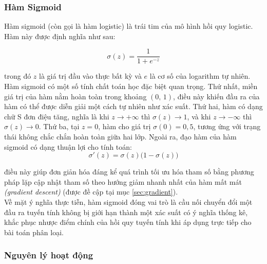 \subsubsection{Hàm Sigmoid}
 
Hàm sigmoid (còn gọi là hàm logistic) là trái tim của mô hình hồi quy logistic. Hàm này được định nghĩa như sau:
 
\begin{equation}
  \sigma(z) = \frac{1}{1 + e^{-z}}
  \label{eq:sigmoid}
\end{equation}
 
\noindent trong đó $z$ là giá trị đầu vào thực bất kỳ và $e$ là cơ số của logarithm tự nhiên.\\
 
Hàm sigmoid có một số tính chất toán học đặc biệt quan trọng. Thứ nhất, miền giá trị của hàm nằm hoàn toàn trong khoảng $(0,\,1)$, điều này khiến đầu ra của hàm có thể được diễn giải một cách tự nhiên như xác suất. Thứ hai, hàm có dạng chữ S đơn điệu tăng, nghĩa là khi $z \to +\infty$ thì $\sigma(z) \to 1$, và khi $z \to -\infty$ thì $\sigma(z) \to 0$. Thứ ba, tại $z = 0$, hàm cho giá trị $\sigma(0) = 0{,}5$, tương ứng với trạng thái không chắc chắn hoàn toàn giữa hai lớp. Ngoài ra, đạo hàm của hàm sigmoid có dạng thuận lợi cho tính toán:\\

\begin{equation}
  \sigma'(z) = \sigma(z)\bigl(1 - \sigma(z)\bigr)
  \label{eq:sigmoid_deriv}
\end{equation}
 
\noindent điều này giúp đơn giản hóa đáng kể quá trình tối ưu hóa tham số bằng phương pháp lặp cập nhật tham số theo hướng giảm nhanh nhất của hàm mất mát \textit{(gradient descent)} (được đề cập tại mục \ref{sec:gradient}).\\
 
Về mặt ý nghĩa thực tiễn, hàm sigmoid đóng vai trò là cầu nối chuyển đổi một đầu ra tuyến tính không bị giới hạn thành một xác suất có ý nghĩa thống kê, khắc phục nhược điểm chính của hồi quy tuyến tính khi áp dụng trực tiếp cho bài toán phân loại.\\

\subsubsection{Nguyên lý hoạt động}
 
